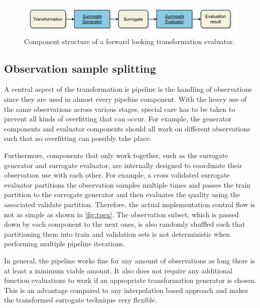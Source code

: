 \documentclass[
  a4paper,  %
  twoside,  %
  bibliography=totoc,
  headsepline,
  cleardoublepage=empty,
  parskip=half,
  draft=false
]{scrbook}
\begin{document}
\begin{mdframed}[style=style,frametitle={Transformation evaluator (forward looking)}]
\begin{figure}[H]
\includegraphics[width=\textwidth]{graphics/TransformationEval.pdf}
\delimit
\caption{Component structure of a forward looking transformation evaluator.}
\label{fig:te}
\end{figure}
\end{mdframed}


\subsection{Observation sample splitting}

A central aspect of the transformation is pipeline is the handling of observations since they are used in almost every pipeline component.
With the heavy use of the same observations across various stages, special care has to be taken to prevent all kinds of overfitting that can occur.
For example, the generator components and evaluator components should all work on different observations such that no overfitting can possibly take place.

Furthermore, components that only work together, such as the surrogate generator and surrogate evaluator, are internally designed to coordinate their observation use with each other.
For example, a cross validated surrogate evaluator partitions the observation samples multiple times and passes the train partition to the surrogate generator and then evaluates the quality using the associated validate partition.
Therefore, the actual implementation control flow is not as simple as shown in \cref{fig:tpex}.
The observation subset, which is passed down by each component to the next ones, is also randomly shuffled such that partitioning them into train and validation sets is not deterministic when performing multiple pipeline iterations.

In general, the pipeline works fine for any amount of observations as long there is at least a minimum viable amount.
It also does not require any additional function evaluations to work if an appropriate transformation generator is chosen.
This is an advantage compared to any interpolation based approach and makes the transformed surrogate technique very flexible.
\end{document}
